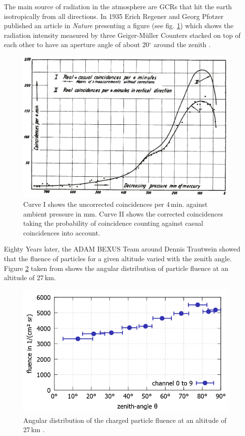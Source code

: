 The main source of radiation in the atmosphere are \acp{GCR} that hit the earth isotropically from all directions. In 1935 Erich Regener and Georg Pfotzer published an article in \textit{Nature} presenting a figure (see fig. \ref{fig:regener1935}) which shows the radiation intensity measured by three Geiger-Müller Counters stacked on top of each other to have an aperture angle of about 20$^\circ$ around the zenith \cite{regener-pfotzer-1935}.

\begin{figure}[H]
    \centering
    \includegraphics[width=0.8\linewidth]{images/01_background/original_regener_pfotzer.png}
    \caption[Regener-Pfotzer-Maximum as shown in \cite{regener-pfotzer-1935}]{Curve I shows the uncorrected coincidences per 4\,min. against ambient pressure in mm. Curve II shows the corrected coincidences taking the probability of coincidence counting against casual coincidences into account\cite{regener-pfotzer-1935}.}
    \label{fig:regener1935}
\end{figure}

Eighty Years later, the \ac{ADAM} \ac{BEXUS} Team around Dennis Trautwein showed that the fluence of particles for a given altitude varied with the zenith angle. Figure \ref{fig:martensen2015} taken from \cite{martensen2015} shows the angular distribution of particle fluence at an altitude of 27\,km.

\begin{figure}[H]
    \centering
    \includegraphics[width=0.6\linewidth]{images/01_background/martensen.png}
    \caption[Results of \acs{ADAM} at 27\,km]{Angular distribution of the charged particle fluence at an altitude of 27\,km \cite{martensen2015}.}
    \label{fig:martensen2015}
\end{figure}

